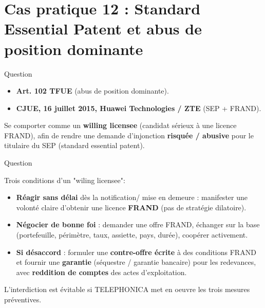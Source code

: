
\section[Cas 12]{Cas pratique 12 : Standard Essential Patent et
abus de position dominante}

\begin{frame}{Question}

\begin{block}{}
\begin{itemize}
  \item \textbf{Art. 102 TFUE} (abus de position dominante).
  \item \textbf{CJUE, 16 juillet 2015, Huawei Technologies / ZTE} (SEP + FRAND).
\end{itemize}
\end{block}

Se comporter comme un \textbf{willing licensee} (candidat sérieux à une licence FRAND),
afin de rendre une demande d'injonction \textbf{risquée / abusive} pour le titulaire du SEP
(standard essential patent).

\end{frame}

\begin{frame}{Question}

Trois conditions d'un "wiling licensee":
\begin{itemize}
  \item \textbf{Réagir sans délai} dès la notification/ mise en demeure : manifester
  une volonté claire d'obtenir une licence \textbf{FRAND} (pas de stratégie dilatoire).
  
  \item \textbf{Négocier de bonne foi} : demander une offre FRAND, échanger sur la base
  (portefeuille, périmètre, taux, assiette, pays, durée), coopérer activement.
  
  \item \textbf{Si désaccord} : formuler une \textbf{contre-offre écrite} à des conditions FRAND
  et fournir une \textbf{garantie} (séquestre / garantie bancaire) pour les redevances,
  avec \textbf{reddition de comptes} des actes d'exploitation.
\end{itemize}

L'interdiction est évitable si TELEPHONICA
met en oeuvre les trois mesures préventives.

\end{frame}